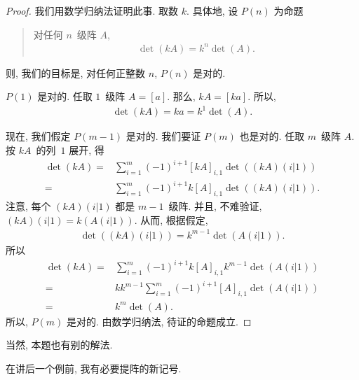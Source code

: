 \documentclass[../libro.tex]{subfiles}
\begin{document}
\begin{proof}
    我们用数学归纳法证明此事.
    取数 \(k\).
    具体地, 设 \(P(n)\) 为命题
    \begin{quotation}
        对任何 \(n\)~级阵 \(A\),
        \begin{align*}
            \det {(kA)} = k^n \det {(A)}.
        \end{align*}
    \end{quotation}
    则, 我们的目标是,
    对任何正整数 \(n\), \(P(n)\) 是对的.

    \(P(1)\) 是对的.
    任取 \(1\)~级阵 \(A = [a]\).
    那么, \(kA = [ka]\).
    所以,
    \begin{align*}
        \det {(kA)} = ka = k^1 \det {(A)}.
    \end{align*}

    现在, 我们假定 \(P(m-1)\) 是对的.
    我们要证 \(P(m)\) 也是对的.
    任取 \(m\)~级阵 \(A\).
    按 \(kA\)~的列~\(1\) 展开, 得
    \begin{align*}
        \det {(kA)}
        = {} & \sum_{i = 1}^{m}
        {(-1)^{i+1} [kA]_{i,1} \det {((kA) (i|1))}}
        \\
        = {} & \sum_{i = 1}^{m}
        {(-1)^{i+1} k [A]_{i,1} \det {((kA) (i|1))}}.
    \end{align*}
    注意, 每个 \((kA)(i|1)\) 都是 \(m-1\)~级阵.
    并且, 不难验证, \((kA)(i|1) = k(A(i|1))\).
    从而, 根据假定,
    \begin{align*}
        \det {((kA)(i|1))} = k^{m-1} \det {(A(i|1))}.
    \end{align*}
    所以
    \begin{align*}
        \det {(kA)}
        = {} & \sum_{i = 1}^{m}
        {(-1)^{i+1} k [A]_{i,1} k^{m-1} \det {(A(i|1))}}
        \\
        = {} & k k^{m-1}
        \sum_{i = 1}^{m}
        {(-1)^{i+1} [A]_{i,1} \det {(A(i|1))}}
        \\
        = {} & k^m \det {(A)}.
    \end{align*}
    所以, \(P(m)\) 是对的.
    由数学归纳法, 待证的命题成立.
\end{proof}

当然, 本题也有别的解法.

\vspace{2ex}

在讲后一个例前,
我有必要提阵的新记号.
\end{document}

